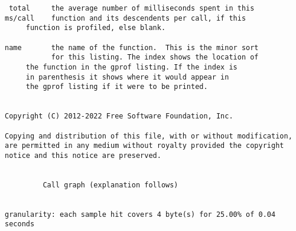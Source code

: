\documentclass[12pt]{article}
\begin{document}
\begin{lstlisting}
 total     the average number of milliseconds spent in this
ms/call    function and its descendents per call, if this
     function is profiled, else blank.

name       the name of the function.  This is the minor sort
           for this listing. The index shows the location of
     the function in the gprof listing. If the index is
     in parenthesis it shows where it would appear in
     the gprof listing if it were to be printed.


Copyright (C) 2012-2022 Free Software Foundation, Inc.

Copying and distribution of this file, with or without modification,
are permitted in any medium without royalty provided the copyright
notice and this notice are preserved.


         Call graph (explanation follows)


granularity: each sample hit covers 4 byte(s) for 25.00% of 0.04 seconds



\end{lstlisting}
\end{document}
